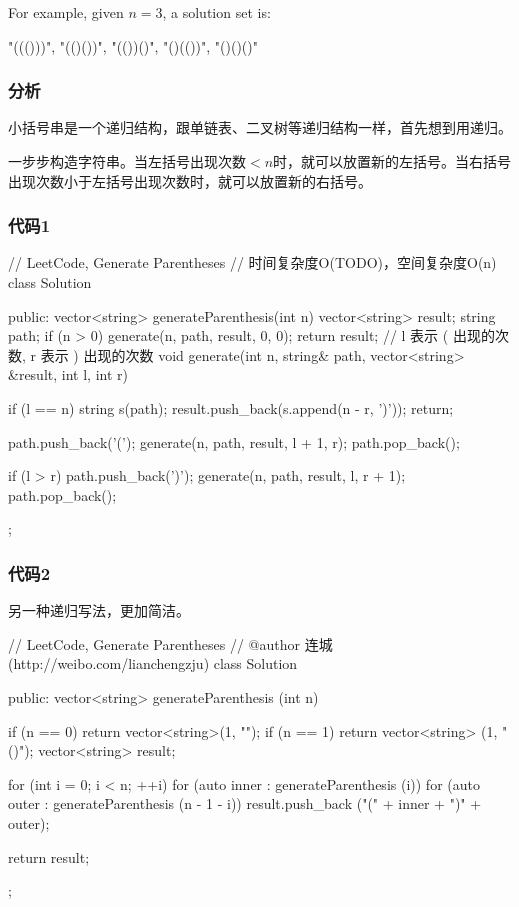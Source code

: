 For example, given $n = 3$, a solution set is:
\begin{Code}
"((()))", "(()())", "(())()", "()(())", "()()()"
\end{Code}

\subsubsection{分析}
小括号串是一个递归结构，跟单链表、二叉树等递归结构一样，首先想到用递归。

一步步构造字符串。当左括号出现次数$<n$时，就可以放置新的左括号。当右括号出现次数小于左括号出现次数时，就可以放置新的右括号。


\subsubsection{代码1}
\begin{Code}
// LeetCode, Generate Parentheses
// 时间复杂度O(TODO)，空间复杂度O(n)
class Solution {
public:
    vector<string> generateParenthesis(int n) {
        vector<string> result;
        string path;
        if (n > 0) generate(n, path, result, 0, 0);
        return result;
    }
    // l 表示 ( 出现的次数, r 表示 ) 出现的次数
    void generate(int n, string& path, vector<string> &result, int l, int r) {
        if (l == n) {
            string s(path);
            result.push_back(s.append(n - r, ')'));
            return;
        }
        
        path.push_back('(');
        generate(n, path, result, l + 1, r);
        path.pop_back();

        if (l > r) {
            path.push_back(')');
            generate(n, path, result, l, r + 1);
            path.pop_back();
        }
    }
};
\end{Code}


\subsubsection{代码2}
另一种递归写法，更加简洁。
\begin{Code}
// LeetCode, Generate Parentheses
// @author 连城 (http://weibo.com/lianchengzju)
class Solution {
public:
    vector<string> generateParenthesis (int n) {
        if (n == 0) return vector<string>(1, "");
        if (n == 1) return vector<string> (1, "()");
        vector<string> result;

        for (int i = 0; i < n; ++i)
            for (auto inner : generateParenthesis (i))
                for (auto outer : generateParenthesis (n - 1 - i))
                    result.push_back ("(" + inner + ")" + outer);

        return result;
    }
};
\end{Code}


